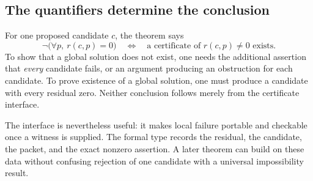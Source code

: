 \subsection{The quantifiers determine the conclusion}
For one proposed candidate $c$, the theorem says
\[
 \neg\bigl(\forall p,\ r(c,p)=0\bigr)
 \quad\Longleftrightarrow\quad
 \text{a certificate of }r(c,p)\ne0\text{ exists}.
\]
To show that a global solution does not exist, one needs the additional assertion that \emph{every} candidate fails, or an argument producing an obstruction for each candidate. To prove existence of a global solution, one must produce a candidate with every residual zero. Neither conclusion follows merely from the certificate interface.

The interface is nevertheless useful: it makes local failure portable and checkable once a witness is supplied. The formal type records the residual, the candidate, the packet, and the exact nonzero assertion. A later theorem can build on these data without confusing rejection of one candidate with a universal impossibility result.
